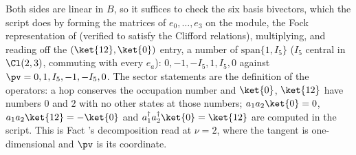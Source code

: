 Both sides are linear in $B$, so it suffices to check the six basis bivectors, which the script does by forming the matrices of $e_{0}, \dots, e_{3}$ on the module, the Fock representation of  (verified to satisfy the Clifford relations), multiplying, and reading off the $(\ket{12}, \ket{0})$ entry, a number of $\mathrm{span}\{1, I_{5}\}$ ($I_{5}$ central in $\Cl(2,3)$, commuting with every $e_{a}$): $0, -1, -I_{5}, 1, I_{5}, 0$ against $\pv = 0, 1, I_{5}, -1, -I_{5}, 0$. The sector statements are the definition of the operators: a hop conserves the occupation number and $\ket{0}$, $\ket{12}$ have numbers $0$ and $2$ with no other states at those numbers; $a_{1}a_{2}\ket{0} = 0$, $a_{1}a_{2}\ket{12} = -\ket{0}$ and $a_{1}^{\dagger}a_{2}^{\dagger}\ket{0} = \ket{12}$ are computed in the script. This is Fact 's decomposition read at $\nu = 2$, where the tangent is one-dimensional and $\pv$ is its coordinate.
